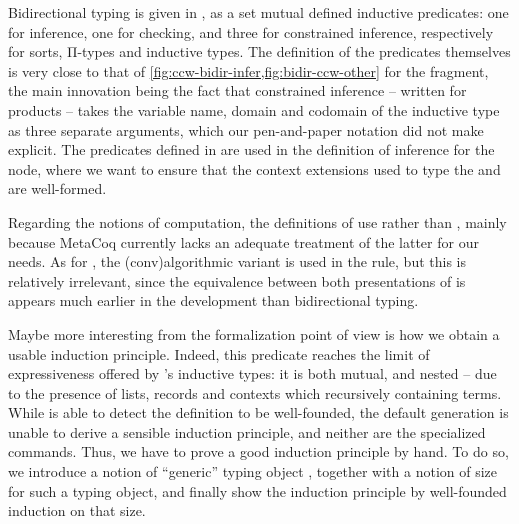 Bidirectional typing is given in
, as a set mutual defined inductive predicates:
one for inference, one for checking, and three for constrained inference, respectively for
sorts, Π-types and inductive types. The definition of the predicates themselves
is very close to that of \cref{fig:ccw-bidir-infer,fig:bidir-ccw-other} for the
 fragment, the main innovation being the fact that constrained inference – 
written  for products –
takes the variable name, domain and codomain of the inductive type as three separate arguments,
which our pen-and-paper notation did not make explicit.
The predicates defined in  are used in the
definition of inference for the  node, where we want to ensure that the
context extensions used to type the  and  are well-formed.

Regarding the notions of computation, the definitions of  use
 rather than , mainly because MetaCoq currently
lacks an adequate treatment of the latter for our needs.%
As for , the \kl(conv){algorithmic} variant is used in the  rule, but
this is relatively irrelevant, since the equivalence between both presentations of  is
appears much earlier in the development than bidirectional typing.

Maybe more interesting from the formalization point of view is how we obtain a usable
induction principle. Indeed, this predicate reaches the limit of expressiveness offered by
’s inductive types: it is both mutual, and nested – due to the presence of lists,
records and contexts which recursively containing terms.
While  is able to detect the definition to be well-founded,
the default generation is unable to derive a sensible induction principle, and neither are
the  specialized commands. Thus, we have to prove a good induction principle by
hand. To do so, we introduce a notion of “generic” typing object
, together with a notion of size for such
a typing object, and finally show the induction principle
by well-founded induction on that size.

